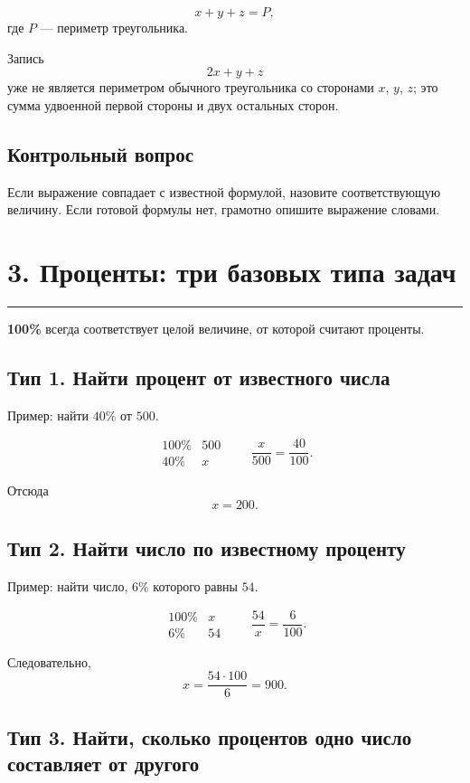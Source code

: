 \documentclass[a4paper,12pt]{article}
\newcommand{\sectionline}{\vspace{-0.35em}\noindent\textcolor{accent}{\rule{\linewidth}{0.6pt}}\vspace{0.35em}}
\newcommand{\key}[1]{\textcolor{darkaccent}{\textbf{#1}}}
\begin{document}
\[
x+y+z=P,
\]
где $P$ --- периметр треугольника.

Запись
\[
2x+y+z
\]
уже не является периметром обычного треугольника со сторонами
$x$, $y$, $z$; это сумма удвоенной первой стороны и двух остальных сторон.

\subsection*{Контрольный вопрос}

Если выражение совпадает с известной формулой, назовите соответствующую
величину. Если готовой формулы нет, грамотно опишите выражение словами.

\clearpage

\section*{3. Проценты: три базовых типа задач}
\sectionline

\key{100\%} всегда соответствует целой величине, от которой считают проценты.

\subsection*{Тип 1. Найти процент от известного числа}

Пример: найти $40\%$ от $500$.

\[
\begin{array}{c|c}
100\% & 500\\
40\% & x
\end{array}
\qquad
\frac{x}{500}
=
\frac{40}{100}.
\]

Отсюда
\[
x=200.
\]

\subsection*{Тип 2. Найти число по известному проценту}

Пример: найти число, $6\%$ которого равны $54$.

\[
\begin{array}{c|c}
100\% & x\\
6\% & 54
\end{array}
\qquad
\frac{54}{x}
=
\frac{6}{100}.
\]

Следовательно,
\[
x
=
\frac{54\cdot100}{6}
=
900.
\]

\subsection*{Тип 3. Найти, сколько процентов одно число составляет от другого}
\end{document}
